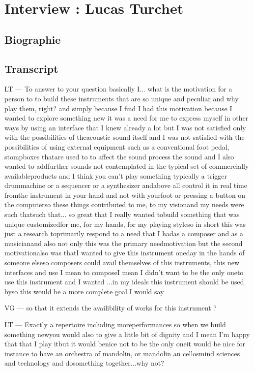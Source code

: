 \chapter{Interview : Lucas Turchet}

\section*{Biographie}

\section*{Transcript}

LT — To answer to your question basically I...  what is the motivation for a person to to build these instruments that are so unique and peculiar and why play them, right? and simply because I find I had this motivation because I wanted to explore something new it was a need for me to express myself in other ways by using an interface  that I knew already a lot but I was not satisfied only with the possibilities of theacoustic sound itself and I was not satisfied with the possibilities of using external equipment such as a conventional foot pedal, stompboxes thatare used to to affect the sound process the sound and I also wanted to addfurther sounds not contemplated in the typical set of commercially availableproducts and I think you can't play something typically a trigger drummachine or a sequencer or a synthesizer andabove all control it in real time fromthe instrument in your hand and not with yourfoot or pressing a button on the computerso these things contributed to me, to my visionand my needs were such thatsuch that... so great that I really wanted tobuild something that was unique customizedfor me, for my hands, for my playing styleso in short this was just a research toprimarily respond to a need that I hadas a composer and as a musicianand also not only this was the primary needmotivation but the second motivationalso was thatI wanted to give this instrument oneday in the hands of someone elseso composers could avail themselves of this instruments, this new interfaces and use I mean to composeI mean I didn't want to be the only oneto use this instrument and I wanted ...in my ideals this instrument should be used byso this would be a more complete goal I would say

VG — so that it extends the availibility of works for this instrument ?

LT — Exactly a repertoire including moreperformances so when we build something newyou would also to give a little bit of dignity and I mean I'm happy that that I play itbut it would benice not to be the only oneit would be nice for instance to have an orchestra of mandolin, or mandolin an cellosmind sciences and technology and dosomething together...why not?

